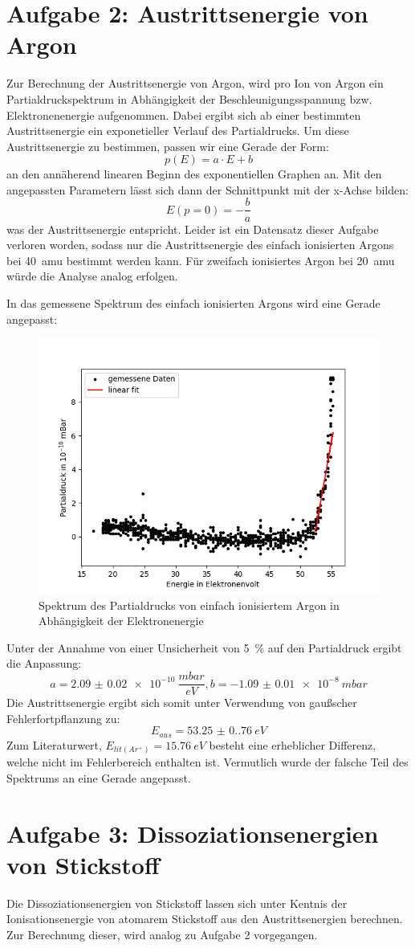 \section{Aufgabe 2: Austrittsenergie von Argon}

Zur Berechnung der Austrittsenergie von Argon, wird pro Ion von Argon ein Partialdruckspektrum in Abhängigkeit der Beschleunigungsspannung bzw. Elektronenenergie aufgenommen. Dabei ergibt sich ab einer bestimmten Austrittsenergie ein exponetieller Verlauf des Partialdrucks. Um diese Austrittsenergie zu bestimmen, passen wir eine Gerade der Form: $$p(E) = a\cdot E + b$$ an den annäherend linearen Beginn des exponentiellen Graphen an. Mit den angepassten Parametern lässt sich dann der Schnittpunkt mit der x-Achse bilden: $$E(p=0) = -\frac{b}{a}$$ was der Austrittsenergie entspricht. Leider ist ein Datensatz dieser Aufgabe verloren worden, sodass nur die Austrittsenergie des einfach ionisierten Argons bei \SI{40}{amu} bestimmt werden kann. Für zweifach ionisiertes Argon bei \SI{20}{amu} würde die Analyse analog erfolgen. 

In das gemessene Spektrum des einfach ionisierten Argons wird eine Gerade angepasst: 
\begin{figure}[H]
    \centering
    \includegraphics[width=140mm,scale=0.8]{Massenspektrometer/include/MSArgon1Ion.png}
    \caption{Spektrum des Partialdrucks von einfach ionisiertem Argon in Abhängigkeit der Elektronenergie}
    \label{fig:MSParDEI}
\end{figure}
Unter der Annahme von einer Unsicherheit von \SI{5}{\%} auf den Partialdruck ergibt die Anpassung:
$$a = \SI{2.09(2)e-10}{\frac{mbar}{eV}}, b= \SI{-1.09(1)e-8}{mbar}$$
Die Austrittsenergie ergibt sich somit unter Verwendung von gaußscher Fehlerfortpflanzung zu:
$$E_{aus} = \SI{53.25(0.76)}{eV}$$
Zum Literaturwert, $E_{lit(Ar^+)}= \SI{15.76}{eV}$\cite{VorbereitungsMappe} besteht eine erheblicher Differenz, welche nicht im Fehlerbereich enthalten ist. Vermutlich wurde der falsche Teil des Spektrums an eine Gerade angepasst.   

\section{Aufgabe 3: Dissoziationsenergien von Stickstoff}

Die Dissoziationsenergien von Stickstoff lassen sich unter Kentnis der Ionisationsenergie von atomarem Stickstoff aus den Austrittsenergien berechnen. Zur Berechnung dieser, wird analog zu Aufgabe 2 vorgegangen. 
